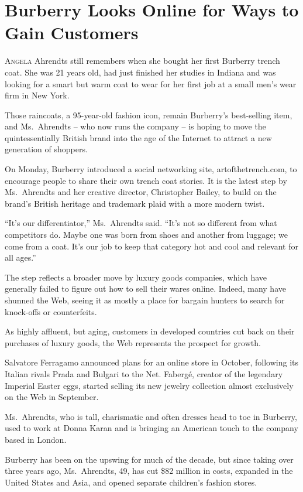 ﻿\documentclass[12pt]{article}
\begin{document}
\section{Burberry Looks Online for Ways to Gain Customers}

\lettrine{A}{ngela} Ahrendts still remembers when she bought her first
Burberry trench coat. She was 21 years old, had just finished her studies in Indiana and was looking
for a smart but warm coat to wear for her first job at a small men's wear firm in New York.

Those raincoats, a 95-year-old fashion icon, remain Burberry's best-selling item, and Ms.~Ahrendts
-- who now runs the company -- is hoping to move the quintessentially British brand into the age of
the Internet to attract a new generation of shoppers.

On Monday, Burberry introduced a social networking site, artofthetrench.com, to encourage people to
share their own trench coat stories. It is the latest step by Ms.~Ahrendts and her creative
director, Christopher Bailey, to build on the brand's British heritage and trademark plaid with a
more modern twist.

``It's our differentiator,'' Ms.~Ahrendts said. ``It's not so different from what competitors do.
Maybe one was born from shoes and another from luggage; we come from a coat. It's our job to keep
that category hot and cool and relevant for all ages.''

The step reflects a broader move by luxury goods companies, which have generally failed to figure
out how to sell their wares online. Indeed, many have shunned the Web, seeing it as mostly a place
for bargain hunters to search for knock-offs or counterfeits.

As highly affluent, but aging, customers in developed countries cut back on their purchases of
luxury goods, the Web represents the prospect for growth.

Salvatore Ferragamo announced plans for an online store in October, following its Italian rivals
Prada and Bulgari to the Net. Faberg\'e, creator of the legendary Imperial Easter eggs, started
selling its new jewelry collection almost exclusively on the Web in September.

Ms.~Ahrendts, who is tall, charismatic and often dresses head to toe in Burberry, used to work at
Donna Karan and is bringing an American touch to the company based in London.

Burberry has been on the upswing for much of the decade, but since taking over three years ago,
Ms.~Ahrendts, 49, has cut \$82 million in costs, expanded in the United States and Asia, and opened
separate children's fashion stores.
\end{document}
